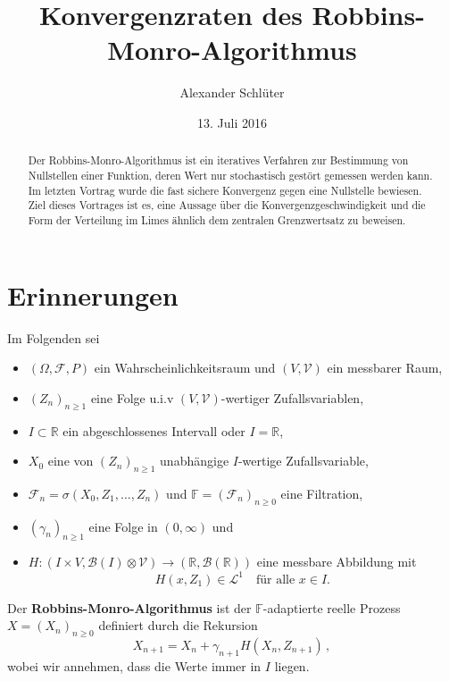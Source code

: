 \documentclass[ngerman,a4paper,11pt]{scrartcl}
\newcommand{\FF}{\mathbb{F}}
\newcommand{\RR}{\mathbb{R}}
\newcommand{\bb}{\mathcal{B}}
\newcommand{\ff}{\mathcal{F}}
\renewcommand{\ll}{\mathcal{L}}
\newcommand{\vv}{\mathcal{V}}
\newcommand{\zspace}{V}
\newcommand{\zsigma}{\vv}
\begin{document}
\title{Konvergenzraten des Robbins-Monro-Algorithmus}
\author{Alexander Schlüter}
\date{13. Juli 2016}
\maketitle
\begin{abstract}
  Der Robbins-Monro-Algorithmus ist ein iteratives Verfahren zur Bestimmung von
  Nullstellen einer Funktion, deren Wert nur stochastisch gestört gemessen
  werden kann. Im letzten Vortrag wurde die fast sichere Konvergenz gegen eine
  Nullstelle bewiesen. Ziel dieses Vortrages ist es, eine Aussage über die
  Konvergenzgeschwindigkeit und die Form der Verteilung im Limes ähnlich dem
  zentralen Grenzwertsatz zu beweisen.
\end{abstract}
\tableofcontents

\section{Erinnerungen}
Im Folgenden sei    
\begin{itemize}
\item $(\Omega, \ff, P)$ ein Wahrscheinlichkeitsraum und $(\zspace,\zsigma)$ ein messbarer Raum,
\item $(Z_n)_{n\geq 1}$ eine Folge u.i.v $(\zspace, \zsigma)$-wertiger Zufallsvariablen,
\item $I\subset\RR$ ein abgeschlossenes Intervall oder $I=\RR$, 
\item $X_0$ eine von $(Z_n)_{n\geq 1}$ unabhängige $I$-wertige Zufallsvariable,
\item $\ff_n=\sigma(X_0,Z_1,\dotsc,Z_n)$ und $\FF=(\ff_n)_{n\geq 0}$ eine Filtration,
\item $(\gamma_n)_{n\geq 1}$ eine Folge in $(0,\infty)$ und
\item $H:(I\times \zspace,\bb(I)\otimes\zsigma)\to(\RR,\bb(\RR))$ eine messbare
  Abbildung mit
  \begin{equation*}
    H(x,Z_1)\in\ll^1\quad\text{für alle $x\in I$.}
  \end{equation*}
\end{itemize}

Der \textbf{Robbins-Monro-Algorithmus} ist der $\FF$-adaptierte reelle Prozess
$X=(X_n)_{n\geq 0}$ definiert durch die Rekursion
\begin{equation}
  \label{eq:algo}
  X_{n+1}=X_n+\gamma_{n+1}H(X_n,Z_{n+1})\,,
\end{equation}
wobei wir annehmen, dass die Werte immer in $I$ liegen.
\end{document}
